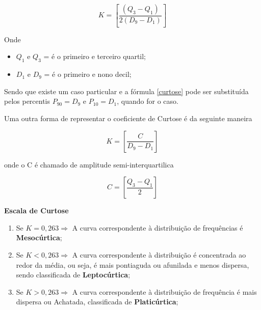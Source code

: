 \begin{equation}\label{curtose}
    K = \left[ \frac{(Q_{3}-Q_{1})}{2(D_{9}-D_{1})} \right]
\end{equation}

Onde

\begin{itemize}
  \item $Q_{1}$ e $Q_{3}$  = é o primeiro e terceiro quartil;
  \item $D_{1}$ e $D_{9}$  = é o primeiro e nono decil;
   \end{itemize}

\vskip0.3cm

Sendo que existe um caso particular e a fórmula \ref{curtose} pode ser substituída
pelos percentis $P_{90}=D_{9}$ e $P_{10}=D_{1}$, quando for o caso.




\vskip0.3cm
Uma outra forma de representar o coeficiente de Curtose é da seguinte maneira

\begin{equation}\label{curtose2}
    K= \left[ \frac{C}{D_{9}-D_{1}} \right]
\end{equation}

onde o C é chamado de amplitude semi-interquartilica

\begin{equation}\label{curtose2}
    C= \left[ \frac{Q_{3}-Q_{1}}{2} \right]
\end{equation}


\textbf{Escala de Curtose}

\begin{enumerate}
\item Se $K = 0,263 \Rightarrow$  A curva correspondente à distribuição de frequências é \textbf{Mesocúrtica};
\item Se $K < 0,263 \Rightarrow$  A curva correspondente à distribuição é concentrada ao redor da média, ou seja, é mais pontiaguda ou afunilada e menos dispersa, sendo classificada de \textbf{Leptocúrtica};
\item Se $K > 0,263 \Rightarrow$ A curva correspondente à distribuição de frequência é mais dispersa ou Achatada, classificada de \textbf{Platicúrtica};
\end{enumerate}

